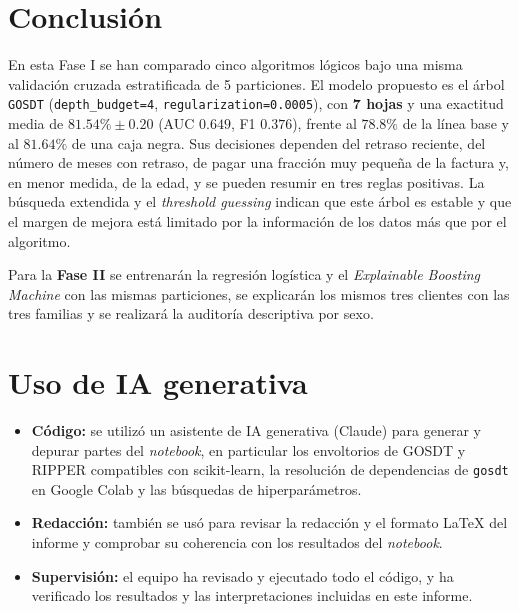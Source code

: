 \documentclass[a4paper,11pt]{article}
\begin{document}
\section{Conclusión}

En esta Fase I se han comparado cinco algoritmos lógicos bajo una misma validación cruzada estratificada de 5 particiones. El modelo propuesto es el árbol \texttt{GOSDT} (\texttt{depth\_budget=4}, \texttt{regularization=0.0005}), con \textbf{7 hojas} y una exactitud media de $\mathbf{81.54\% \pm 0.20}$ (AUC $0.649$, F1 $0.376$), frente al $78.8\%$ de la línea base y al $81.64\%$ de una caja negra. Sus decisiones dependen del retraso reciente, del número de meses con retraso, de pagar una fracción muy pequeña de la factura y, en menor medida, de la edad, y se pueden resumir en tres reglas positivas. La búsqueda extendida y el \textit{threshold guessing} indican que este árbol es estable y que el margen de mejora está limitado por la información de los datos más que por el algoritmo.

Para la \textbf{Fase II} se entrenarán la regresión logística y el \textit{Explainable Boosting Machine} con las mismas particiones, se explicarán los mismos tres clientes con las tres familias y se realizará la auditoría descriptiva por sexo.




\section*{Uso de IA generativa}

\begin{itemize}
    \item \textbf{Código:} se utilizó un asistente de IA generativa (Claude) para generar y depurar partes del \textit{notebook}, en particular los envoltorios de GOSDT y RIPPER compatibles con scikit-learn, la resolución de dependencias de \texttt{gosdt} en Google Colab y las búsquedas de hiperparámetros.
    \item \textbf{Redacción:} también se usó para revisar la redacción y el formato \LaTeX{} del informe y comprobar su coherencia con los resultados del \textit{notebook}.
    \item \textbf{Supervisión:} el equipo ha revisado y ejecutado todo el código, y ha verificado los resultados y las interpretaciones incluidas en este informe.
\end{itemize}
\end{document}
